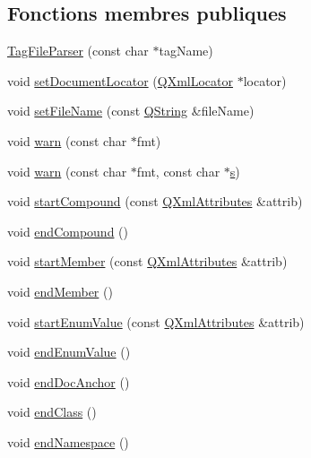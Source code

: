 \subsection*{Fonctions membres publiques}
\begin{DoxyCompactItemize}
\item 
\hyperlink{class_tag_file_parser_a4f139dc60355077bdb6a0c6a0ba7fd2f}{Tag\+File\+Parser} (const char $\ast$tag\+Name)
\item 
void \hyperlink{class_tag_file_parser_a947ca98759d61b5cf3d920a7d98fa828}{set\+Document\+Locator} (\hyperlink{class_q_xml_locator}{Q\+Xml\+Locator} $\ast$locator)
\item 
void \hyperlink{class_tag_file_parser_a4f993458f2f874771d87e8b4e3373925}{set\+File\+Name} (const \hyperlink{class_q_string}{Q\+String} \&file\+Name)
\item 
void \hyperlink{class_tag_file_parser_acf72e17ee641ea46db2b05c6350bd1c2}{warn} (const char $\ast$fmt)
\item 
void \hyperlink{class_tag_file_parser_afbd2e881b3cf9f30d61c62588e9e05fc}{warn} (const char $\ast$fmt, const char $\ast$\hyperlink{060__command__switch_8tcl_a011c73f2dbb87635a3b4206c72355f6e}{s})
\item 
void \hyperlink{class_tag_file_parser_a19aa90dae712fab6fc13b84d9b568ce5}{start\+Compound} (const \hyperlink{class_q_xml_attributes}{Q\+Xml\+Attributes} \&attrib)
\item 
void \hyperlink{class_tag_file_parser_a10b74d69f1beb95fb58bcde418d78521}{end\+Compound} ()
\item 
void \hyperlink{class_tag_file_parser_a9ce94f71fd0686afe0bb6d9ffa6dc9cb}{start\+Member} (const \hyperlink{class_q_xml_attributes}{Q\+Xml\+Attributes} \&attrib)
\item 
void \hyperlink{class_tag_file_parser_aed63e6356c833e71abdf24884aee6145}{end\+Member} ()
\item 
void \hyperlink{class_tag_file_parser_a4679fa698fea5d4896f870b28796a870}{start\+Enum\+Value} (const \hyperlink{class_q_xml_attributes}{Q\+Xml\+Attributes} \&attrib)
\item 
void \hyperlink{class_tag_file_parser_a707d4cc38038eb4108c949b91e75121c}{end\+Enum\+Value} ()
\item 
void \hyperlink{class_tag_file_parser_aa00881e9a81fccda41ab9111261c2b58}{end\+Doc\+Anchor} ()
\item 
void \hyperlink{class_tag_file_parser_a9e3e83215c3dc1433589d72835c16dba}{end\+Class} ()
\item 
void \hyperlink{class_tag_file_parser_a604566afd5d8237b6a8626d30b1b1902}{end\+Namespace} ()

\end{DoxyCompactItemize}

